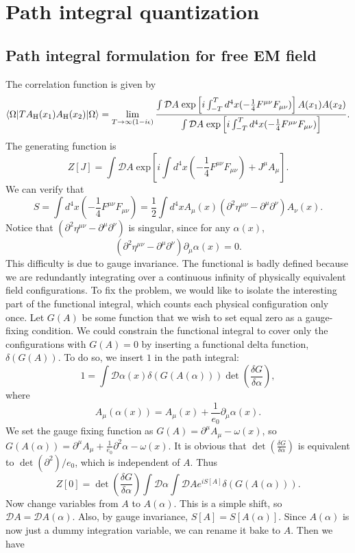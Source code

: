 \section{Path integral quantization}
\subsection{Path integral formulation for free EM field}
The correlation function is given by
\[\langle \Omega | T A_{\rm H}(x_1) A_{\rm H}(x_2)| \Omega \rangle = \lim_{T \to \infty(1-i\epsilon)} \frac{\int \mathcal{D}A \; \mathrm{exp} \left[ i\int_{-T}^T d^4x (-\frac{1}{4} F^{\mu\nu}F_{\mu\nu}) \right] A(x_1) A(x_2)}{\int \mathcal{D}A \; \mathrm{exp} \left[ i\int_{-T}^T d^4x (-\frac{1}{4} F^{\mu\nu}F_{\mu\nu}) \right]}.\]
The generating function is 
\[Z[J] = \int \mathcal{D}A \; \mathrm{exp} \left[ i\int d^4x (-\frac{1}{4} F^{\mu\nu}F_{\mu\nu}) + J^{\mu} A_{\mu} \right].\]
We can verify that
\[S = \int d^4x (-\frac{1}{4} F^{\mu\nu}F_{\mu\nu}) = \frac{1}{2} \int d^4x A_{\mu}(x) (\partial^2\eta^{\mu\nu} - \partial^{\mu}\partial^{\nu})A_{\nu}(x).\]
Notice that $(\partial^2\eta^{\mu\nu} - \partial^{\mu}\partial^{\nu})$ is singular, since for any $\alpha(x)$, 
\[(\partial^2\eta^{\mu\nu} - \partial^{\mu}\partial^{\nu})\partial_{\mu}\alpha(x) = 0.\]
This difficulty is due to gauge invariance. 
The functional is badly defined because we are redundantly integrating over a continuous infinity of physically equivalent field configurations. To fix the problem, we would like to isolate the interesting part of the functional integral, which counts each physical configuration only once.
Let $G(A)$ be some function that we wish to set equal zero as a gauge-fixing condition. We could constrain the functional integral to cover only the configurations with $G(A) = 0$ by inserting a functional delta function, $\delta(G(A))$. To do so, we insert $1$ in the path integral:
\[ 1 = \int \mathcal{D}\alpha(x) \delta(G(A(\alpha))) \det \left( \frac{\delta G}{\delta \alpha} \right),\]
where
\[A_{\mu}(\alpha(x)) = A_{\mu}(x) + \frac{1}{e_0}\partial_{\mu}\alpha(x).\]
We set the gauge fixing function as $G(A) = \partial^{\mu} A_{\mu} -\omega(x)$, so $G(A(\alpha)) = \partial^{\mu} A_{\mu} + \frac{1}{e_0}\partial^2 \alpha - \omega(x)$. It is obvious that $\det \left( \frac{\delta G}{\delta \alpha} \right)$ is equivalent to $\det(\partial^2)/e_0$, which is independent of $A$. Thus
\[Z[0] = \det \left( \frac{\delta G}{\delta \alpha} \right) \int \mathcal{D}\alpha \int \mathcal{D}A e^{iS[A]} \delta(G(A(\alpha))).\]
Now change variables from $A$ to $A(\alpha)$. This is a simple shift, so $\mathcal{D}A = \mathcal{D}A(\alpha)$. Also, by gauge invariance, $S[A] = S[A(\alpha)]$. Since $A(\alpha)$ is now just a dummy integration variable, we can rename it bake to $A$. Then we have
